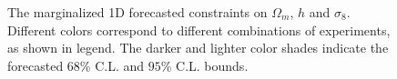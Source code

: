 \documentclass[prd,nofootinbib,showpacs]{revtex4}
\begin{document}
\begin{figure}[h!]
\begin{center}
\hspace{5mm}
\caption{The marginalized 1D forecasted constraints on $\Omega_m$, $h$ and $\sigma_8$. Different colors correspond to different combinations of experiments, as shown in legend. The darker and lighter color shades indicate the forecasted $68\%$ C.L. and $95\%$ C.L. bounds.}\label{fig:1Dfigure}
\end{center}
\end{figure}
\end{document}
